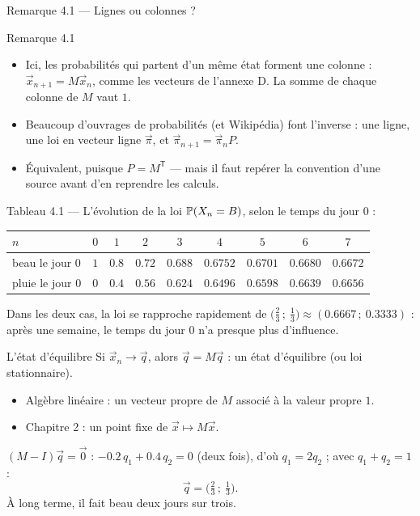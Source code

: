 \begin{frame}{Remarque 4.1 --- Lignes ou colonnes ?}
  \begin{Rem}{Remarque 4.1}
    \begin{itemize}
      \item Ici, les probabilités qui partent d'un même état forment une
        colonne : $\vec x_{n+1}=M\vec x_n$, comme les vecteurs de
        l'annexe D. La somme de chaque colonne de $M$ vaut $1$.
      \item Beaucoup d'ouvrages de probabilités (et Wikipédia) font
        l'inverse : une ligne, une loi en vecteur ligne $\vec\pi$, et
        $\vec\pi_{n+1}=\vec\pi_nP$.
      \item Équivalent, puisque $P=M^{\mathsf T}$ --- mais il faut repérer
        la convention d'une source avant d'en reprendre les calculs.
    \end{itemize}
  \end{Rem}
\end{frame}

\begin{frame}{Tableau 4.1 --- L'évolution de la loi}
  \small $\P{X_n=B}$, selon le temps du jour $0$ :
  \begin{center}
  \footnotesize
  \begin{tabular}{lcccccccc}
    \toprule
    $n$ & $0$ & $1$ & $2$ & $3$ & $4$ & $5$ & $6$ & $7$ \\
    \midrule
    beau le jour $0$ & $1$ & $\num{0.8}$ & $\num{0.72}$ & $\num{0.688}$ & $\num{0.6752}$ & $\num{0.6701}$ & $\num{0.6680}$ & $\num{0.6672}$ \\
    pluie le jour $0$ & $0$ & $\num{0.4}$ & $\num{0.56}$ & $\num{0.624}$ & $\num{0.6496}$ & $\num{0.6598}$ & $\num{0.6639}$ & $\num{0.6656}$ \\
    \bottomrule
  \end{tabular}
  \end{center}
  \small Dans les deux cas, la loi se rapproche rapidement de
  $\big(\tfrac23\,;\ \tfrac13\big)\approx(\num{0.6667}\,;\ \num{0.3333})$ :
  après une semaine, le temps du jour $0$ n'a presque plus d'influence.
\end{frame}

\begin{frame}{L'état d'équilibre}
  \small Si $\vec x_n\to\vec q$, alors $\vec q=M\vec q$ : un état
  d'équilibre (ou loi stationnaire).
  \begin{itemize}
    \item Algèbre linéaire : un vecteur propre de $M$ associé à la
      valeur propre $1$.
    \item Chapitre 2 : un point fixe de $\vec x\mapsto M\vec x$.
  \end{itemize}
  $(M-I)\vec q=\vec 0$ : $-\num{0.2}\,q_1+\num{0.4}\,q_2=0$ (deux fois),
  d'où $q_1=2q_2$ ; avec $q_1+q_2=1$ :
  \[
    \vec q = \big(\tfrac23\,;\ \tfrac13\big).
  \]
  À long terme, il fait beau deux jours sur trois.
\end{frame}

